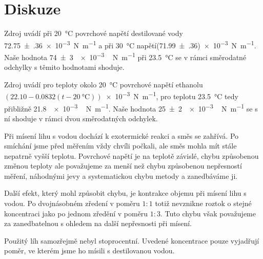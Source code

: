 \section*{Diskuze}
Zdroj \cite{napetivoda} uvádí při \SI{20}{\degreeCelsius} povrchové napětí destilované vody \num{72.75(36)}\SI{e-3}{\newton\per\metre} a při \SI{30}{\degreeCelsius} napětí\linebreak (\num{71.99(36)})\SI{e-3}{\newton\per\metre}.
Naše hodnota 
\SI{74(3)}{\num{e-3}\,\newton \per \metre}
při \SI{23.5}{\degreeCelsius} se v rámci směrodatné odchylky s těmito hodnotami shoduje.

Zdroj \cite{napetiethanol} uvádí pro teploty okolo \SI{20}{\degreeCelsius} povrchové napětí ethanolu $(\num{22.10} - \num{0.0832}(t- \SI{20}{\degreeCelsius}))$\SI{e-3}{\newton\per\metre}, pro teplotu \SI{23.5}{\degreeCelsius} tedy přibližně \SI{21.8}{\num{e-3}\,\newton \per \metre}.
Naše hodnota \SI{25(2)}{\num{e-3}\,\newton \per \metre} se s ní shoduje v rámci dvou směrodatných odchylek.

Při mísení lihu s vodou dochází k exotermické reakci a směs se zahřívá.
Po smíchání jsme před měřením vždy chvíli počkali, ale směs mohla mít stále nepatrně vyšší teplotu.
Povrchové napětí je na teplotě závislé, chybu způsobenou změnou teploty ale považujeme za menší než chybu způsobenou nepřesností měření, náhodnými jevy a systematickou chybu metody a zanedbáváme ji. 

Další efekt, který mohl způsobit chybu, je kontrakce objemu při mísení lihu s vodou.
Po dvojnásobném zředení v poměru $1:1$ totiž nevznikne roztok o stejné koncentraci jako po jednom zředění v poměru $1:3$.
Tuto chybu však považujeme za zanedbatelnou s ohledem na další nepřesnosti při mísení.

Použitý líh samozřejmě nebyl stoprocentní.
Uvedené koncentrace pouze vyjadřují poměr, ve kterém jsme ho mísili s destilovanou vodou.